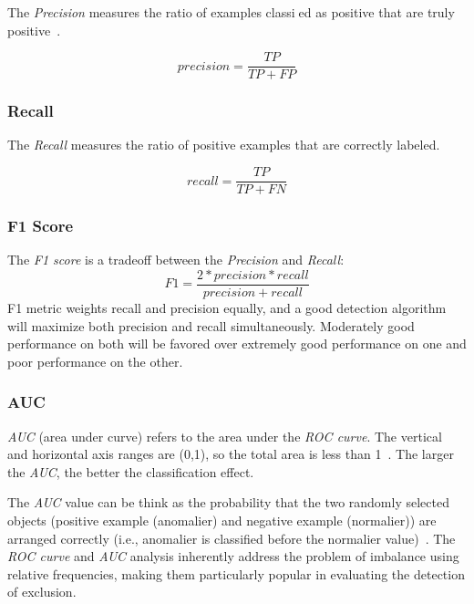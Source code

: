 The \textit{Precision} measures the ratio of
examples classied as positive that
are truly positive~\cite{ting2010precision}.

\begin{equation}
  precision=\frac{TP}{TP+FP}
\end{equation}

\subsubsection{Recall}
The \textit{Recall} measures the ratio of positive examples that
 are correctly labeled.

\begin{equation}
  recall=\frac{TP}{TP+FN}
\end{equation}

\subsubsection{F1 Score}
The \textit{F1 score} is a tradeoff between
the \textit{Precision} and \textit{Recall}:
\begin{equation}
  F1=\frac{2*precision*recall}{precision+recall}
\end{equation}
F1 metric weights recall and
precision equally,
and a good detection algorithm will
maximize both precision and
recall simultaneously.
Moderately good performance on
both will be favored over
extremely good performance on
one and poor performance on the other.

\subsubsection{AUC}
\textit{AUC} (area under curve) refers to the area under the \textit{ROC curve}.
The vertical and horizontal axis ranges are (0,1),
so the total area is less than 1~\cite{bradley1997use}.
The larger the \textit{AUC},
the better the classification effect.

The \textit{AUC} value can be think as the probability that 
the two randomly selected objects (positive example (anomalier) 
and negative example (normalier)) are arranged correctly 
(i.e.,
anomalier is classified before the normalier value)~\cite{hanley1982meaning}.
The \textit{ROC curve} and \textit{AUC} 
analysis inherently address the problem of imbalance using
relative frequencies,
making them particularly popular in evaluating 
the detection of exclusion.



